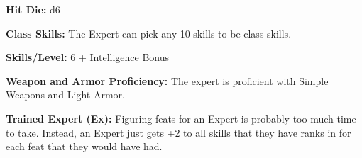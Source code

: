 
\textbf{Hit Die:} d6

\textbf{Class Skills:} The Expert can pick any 10 skills to be class skills.

\textbf{Skills/Level:} 6 + Intelligence Bonus

\modebab
\poorfor
\poorref
\goodwil

\begin{classtable}
\leveltwo{}
\levelthree{}
\levelfour{}
\levelfive{}
\end{classtable}

\classfeatures

\textbf{Weapon and Armor Proficiency:} The expert is proficient with Simple Weapons and Light Armor.

\textbf{Trained Expert (Ex):} Figuring feats for an Expert is probably too much time to take. Instead, an Expert just gets +2 to all skills that they have ranks in for each feat that they would have had.